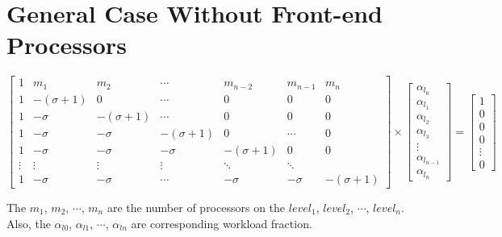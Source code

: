 \section{General Case Without Front-end Processors}
\begin{equation}
{
\left[ \begin{array}{ccccccc}
1 & m_{1} & m_{2} & \cdots & m_{n-2} & m_{n-1} & m_{n}\\
1 & -(\sigma + 1) & 0 & \cdots& 0 & 0 & 0\\
1 & -\sigma & -(\sigma + 1) & \cdots & 0 & 0 & 0 \\
1 & -\sigma & -\sigma & -(\sigma + 1) & 0 & \cdots & 0 \\
1 & -\sigma & -\sigma & -\sigma & -(\sigma + 1) & 0 & 0 \\
\vdots & \vdots & \vdots  &   \vdots & \ddots & \ddots\\
1 & -\sigma & -\sigma & \cdots & -\sigma & -\sigma & -(\sigma + 1)
\end{array} 
\right ]} \times \left[ \begin{array}{c}
\alpha_{l_{0}} \\
\alpha_{l_{1}} \\
\alpha_{l_{2}} \\
\alpha_{l_{3}} \\
\vdots \\
\alpha_{l_{n-1}}\\
\alpha_{l_{n}}
\end{array} 
\right ] = \left[ \begin{array}{c}
1 \\
0 \\
0 \\
0 \\
\vdots \\
0
\end{array} 
\right ]
\end{equation}

The $m_{1}$, $m_{2}$, $\cdots$, $m_{n}$ are the number of processors on the $level_{1}$, $level_{2}$, $\cdots$, $level_{n}$.   Also, the $\alpha_{l0}$, $\alpha_{l1}$,  $\cdots$, $\alpha_{ln}$ are corresponding workload fraction.  
